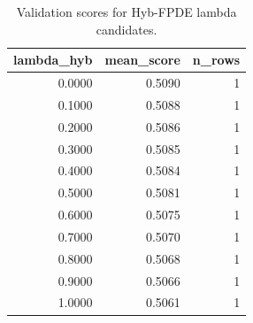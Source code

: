\begin{table}[t]
\caption{Validation scores for Hyb-FPDE lambda candidates.}
\label{tab:lambda_distribution_computed}
\centering
\begin{tabular}{rrr}
\toprule
lambda\_hyb & mean\_score & n\_rows \\
\midrule
0.0000 & 0.5090 & 1 \\
0.1000 & 0.5088 & 1 \\
0.2000 & 0.5086 & 1 \\
0.3000 & 0.5085 & 1 \\
0.4000 & 0.5084 & 1 \\
0.5000 & 0.5081 & 1 \\
0.6000 & 0.5075 & 1 \\
0.7000 & 0.5070 & 1 \\
0.8000 & 0.5068 & 1 \\
0.9000 & 0.5066 & 1 \\
1.0000 & 0.5061 & 1 \\
\bottomrule
\end{tabular}

\end{table}
